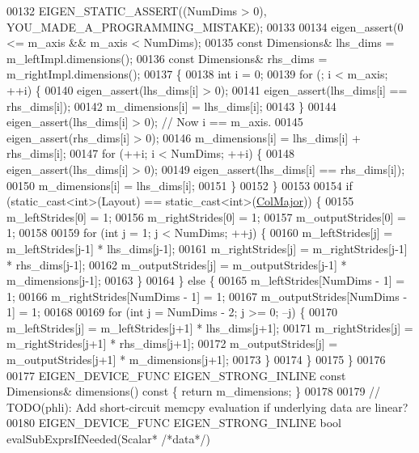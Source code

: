 \begin{DoxyCode}
00132     EIGEN\_STATIC\_ASSERT((NumDims > 0), YOU\_MADE\_A\_PROGRAMMING\_MISTAKE);
00133 
00134     eigen\_assert(0 <= m\_axis && m\_axis < NumDims);
00135     \textcolor{keyword}{const} Dimensions& lhs\_dims = m\_leftImpl.dimensions();
00136     \textcolor{keyword}{const} Dimensions& rhs\_dims = m\_rightImpl.dimensions();
00137     \{
00138       \textcolor{keywordtype}{int} i = 0;
00139       \textcolor{keywordflow}{for} (; i < m\_axis; ++i) \{
00140         eigen\_assert(lhs\_dims[i] > 0);
00141         eigen\_assert(lhs\_dims[i] == rhs\_dims[i]);
00142         m\_dimensions[i] = lhs\_dims[i];
00143       \}
00144       eigen\_assert(lhs\_dims[i] > 0);  \textcolor{comment}{// Now i == m\_axis.}
00145       eigen\_assert(rhs\_dims[i] > 0);
00146       m\_dimensions[i] = lhs\_dims[i] + rhs\_dims[i];
00147       \textcolor{keywordflow}{for} (++i; i < NumDims; ++i) \{
00148         eigen\_assert(lhs\_dims[i] > 0);
00149         eigen\_assert(lhs\_dims[i] == rhs\_dims[i]);
00150         m\_dimensions[i] = lhs\_dims[i];
00151       \}
00152     \}
00153 
00154     \textcolor{keywordflow}{if} (static\_cast<int>(Layout) == static\_cast<int>(\hyperlink{group__enums_ggaacded1a18ae58b0f554751f6cdf9eb13a0cbd4bdd0abcfc0224c5fcb5e4f6669a}{ColMajor})) \{
00155       m\_leftStrides[0] = 1;
00156       m\_rightStrides[0] = 1;
00157       m\_outputStrides[0] = 1;
00158 
00159       \textcolor{keywordflow}{for} (\textcolor{keywordtype}{int} j = 1; j < NumDims; ++j) \{
00160         m\_leftStrides[j] = m\_leftStrides[j-1] * lhs\_dims[j-1];
00161         m\_rightStrides[j] = m\_rightStrides[j-1] * rhs\_dims[j-1];
00162         m\_outputStrides[j] = m\_outputStrides[j-1] * m\_dimensions[j-1];
00163       \}
00164     \} \textcolor{keywordflow}{else} \{
00165       m\_leftStrides[NumDims - 1] = 1;
00166       m\_rightStrides[NumDims - 1] = 1;
00167       m\_outputStrides[NumDims - 1] = 1;
00168 
00169       \textcolor{keywordflow}{for} (\textcolor{keywordtype}{int} j = NumDims - 2; j >= 0; --j) \{
00170         m\_leftStrides[j] = m\_leftStrides[j+1] * lhs\_dims[j+1];
00171         m\_rightStrides[j] = m\_rightStrides[j+1] * rhs\_dims[j+1];
00172         m\_outputStrides[j] = m\_outputStrides[j+1] * m\_dimensions[j+1];
00173       \}
00174     \}
00175   \}
00176 
00177   EIGEN\_DEVICE\_FUNC EIGEN\_STRONG\_INLINE \textcolor{keyword}{const} Dimensions& dimensions()\textcolor{keyword}{ const }\{ \textcolor{keywordflow}{return} m\_dimensions; \}
00178 
00179   \textcolor{comment}{// TODO(phli): Add short-circuit memcpy evaluation if underlying data are linear?}
00180   EIGEN\_DEVICE\_FUNC EIGEN\_STRONG\_INLINE \textcolor{keywordtype}{bool} evalSubExprsIfNeeded(Scalar* \textcolor{comment}{/*data*/})

\end{DoxyCode}
